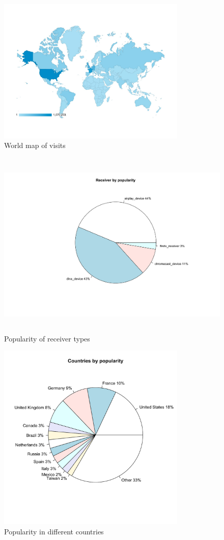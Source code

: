 \begin{figure}[htb]
\centering \includegraphics[width=9cm]{charts/session_world_map}
\caption{World map of visits \label{user_map}}
\end{figure}

\begin{figure}[htb]
\centering \includegraphics[height=9cm]{charts/receiver_popularity}
\caption{Popularity of receiver types \label{receiver_types}}
\end{figure}

\begin{figure}[htb]
\centering \includegraphics[height=9cm]{charts/country_popularity}
\caption{Popularity in different countries \label{user_country}}
\end{figure}


